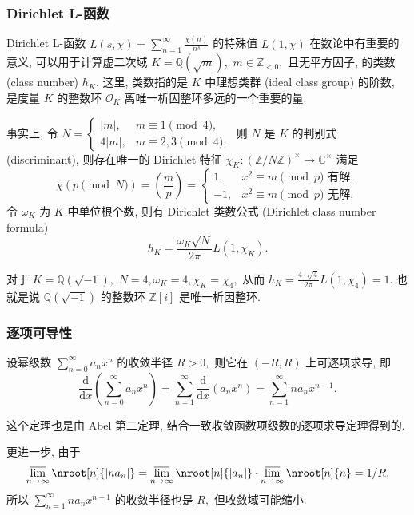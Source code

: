 \begin{frame}
\frametitle{Dirichlet L-函数}

Dirichlet L-函数 $L(s, \chi) = \sum_{n=1}^{\infty} \frac{\chi(n)}{n^s}$ 的特殊值 $L(1, \chi)$ 在数论中有重要的意义, 可以用于计算虚二次域 $K = \mathbb{Q}(\sqrt{m}),$ $m \in \mathbb{Z}_{<0},$ 且无平方因子, 的类数 (class number) $h_K.$ 这里, 类数指的是 $K$ 中理想类群 (ideal class group) 的阶数, 是度量 $K$ 的整数环 $\mathcal{O}_K$ 离唯一析因整环多远的一个重要的量.

\pause

事实上, 令 $N = \begin{cases} |m|, & m \equiv 1 \pmod{4}, \\ 4|m|, & m \equiv 2, 3 \pmod{4}, \end{cases}$ 则 $N$ 是 $K$ 的判别式 (discriminant), 则存在唯一的 Dirichlet 特征 $\chi_K: \left( \mathbb{Z} / N\mathbb{Z} \right)^\times \to \mathbb{C}^\times$ 满足
\[
\chi(p \pmod{N}) = \left( \frac{m}{p} \right) = \begin{cases} 1, & x^2 \equiv m \pmod{p} \text{ 有解}, \\ -1, & x^2 \equiv m \pmod{p} \text{ 无解}.\end{cases}
\]
令 $\omega_K$ 为 $K$ 中单位根个数, 则有 Dirichlet 类数公式 (Dirichlet class number formula)
\[
h_K = \dfrac{\omega_K \sqrt{N}}{2\pi} L(1, \chi_K).
\]

\pause

对于 $K = \mathbb{Q}(\sqrt{-1}),$ $N = 4, \omega_K = 4, \chi_K = \chi_4,$ 从而 $h_K = \frac{4 \cdot \sqrt{4}}{2\pi} L(1, \chi_4) = 1.$ 也就是说 $\mathbb{Q}(\sqrt{-1})$ 的整数环 $\mathbb{Z}[i]$ 是唯一析因整环.

\end{frame}


\begin{frame}
\frametitle{逐项可导性}

\begin{thm}[幂级数的逐项可导性]
设幂级数 $\displaystyle \sum_{n=0}^{\infty} a_n x^n$ 的收敛半径 $R > 0,$ 则它在 $(-R, R)$ 上可逐项求导, 即
\[
\frac{\mathrm{d}}{\mathrm{d}x} \left( \sum_{n=0}^{\infty} a_n x^n \right) = \sum_{n=1}^{\infty} \frac{\mathrm{d}}{\mathrm{d}x} \left( a_n x^n \right) = \sum_{n=1}^{\infty} n a_n x^{n-1}.
\]
\end{thm}

\pause
\vspace{0.5em}

这个定理也是由 Abel 第二定理, 结合一致收敛函数项级数的逐项求导定理得到的.

\pause
\vspace{0.5em}

更进一步, 由于
\[
\varlimsup_{n\to\infty} \nroot[n]{|n a_n|} = \varlimsup_{n\to\infty} \nroot[n]{|a_n|} \cdot \varlimsup_{n\to\infty} \nroot[n]{n} = 1/R,
\]
所以 $\displaystyle \sum_{n=1}^{\infty} n a_n x^{n-1}$ 的收敛半径也是 $R,$ \alert{但收敛域可能缩小.}

\end{frame}


